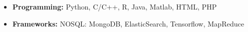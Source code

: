 
\begin{itemize}
    \item \textbf{Programming:} Python, C/C++, R, Java, Matlab,
  HTML, PHP

  \item \textbf{Frameworks:} NOSQL: MongoDB, ElasticSearch, Tensorflow,
  MapReduce
\end{itemize}

